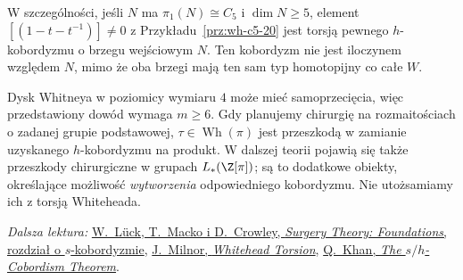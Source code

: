 \begin{uwaga}
W szczególności, jeśli $N$ ma
$\pi_1(N)\cong C_5$ i $\dim N\geq5$, element
$[(1-t-t^{-1})]\ne0$ z
Przykładu~\ref{prz:wh-c5-20} jest torsją
pewnego $h$-kobordyzmu o brzegu wejściowym
$N$. Ten kobordyzm nie jest iloczynem
względem $N$, mimo że oba brzegi mają ten
sam typ homotopijny co całe $W$.
\end{uwaga}

\begin{uwaga}
Dysk Whitneya w poziomicy wymiaru $4$ może
mieć samoprzecięcia, więc przedstawiony dowód
wymaga $m\geq6$. Gdy planujemy chirurgię
na rozmaitościach o zadanej grupie podstawowej,
$\tau\in\operatorname{Wh}(\pi)$ jest przeszkodą
w zamianie uzyskanego $h$-kobordyzmu na produkt.
W dalszej teorii pojawią się także przeszkody
chirurgiczne w grupach $L_*(\Z[\pi])$;
są to dodatkowe obiekty, określające możliwość
\emph{wytworzenia} odpowiedniego kobordyzmu.
Nie utożsamiamy ich z torsją Whiteheada.
\end{uwaga}

\par\smallskip
{\footnotesize\noindent\emph{Dalsza lektura:}
\href{https://him-lueck.uni-bonn.de/data/Chapter_s-Cobordism_theorem.pdf}
{W.~Lück, T.~Macko i D.~Crowley, \emph{Surgery Theory: Foundations},
rozdział o $s$-kobordyzmie},
\href{https://webhomes.maths.ed.ac.uk/~v1ranick/papers/milnorwh.pdf}
{J.~Milnor, \emph{Whitehead Torsion}},
\href{https://qkhan.pages.iu.edu/research/SLIDES/Lecture02_KHAN.pdf}
{Q.~Khan, \emph{The $s/h$-Cobordism Theorem}}.\par}

\clearpage
